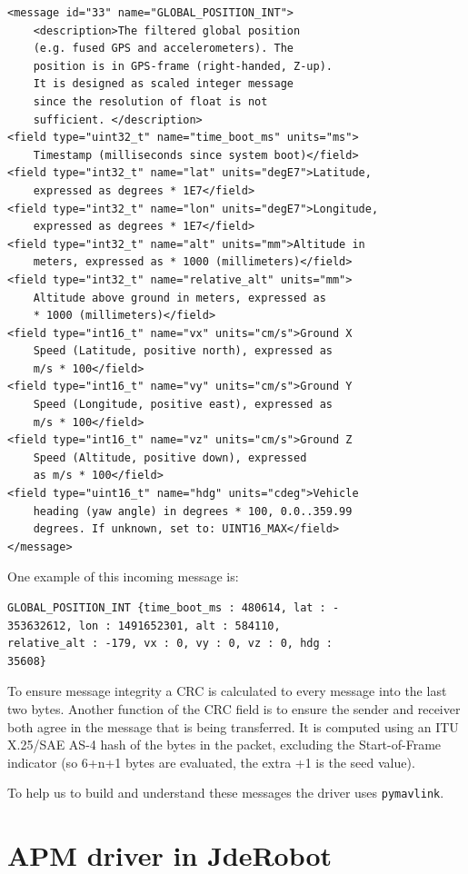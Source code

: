 \documentclass{llncs}
\begin{document}
\begin{verbatim}
<message id="33" name="GLOBAL_POSITION_INT">
	<description>The filtered global position 
	(e.g. fused GPS and accelerometers). The 
	position is in GPS-frame (right-handed, Z-up).
	It is designed as scaled integer message 
	since the resolution of float is not 
	sufficient.	</description>
<field type="uint32_t" name="time_boot_ms" units="ms">
	Timestamp (milliseconds since system boot)</field>
<field type="int32_t" name="lat" units="degE7">Latitude, 
	expressed as degrees * 1E7</field>
<field type="int32_t" name="lon" units="degE7">Longitude, 
	expressed as degrees * 1E7</field>
<field type="int32_t" name="alt" units="mm">Altitude in 
	meters, expressed as * 1000 (millimeters)</field>
<field type="int32_t" name="relative_alt" units="mm">
	Altitude above ground in meters, expressed as 
	* 1000 (millimeters)</field>
<field type="int16_t" name="vx" units="cm/s">Ground X 
	Speed (Latitude, positive north), expressed as 
	m/s * 100</field>
<field type="int16_t" name="vy" units="cm/s">Ground Y 
	Speed (Longitude, positive east), expressed as 
	m/s * 100</field>
<field type="int16_t" name="vz" units="cm/s">Ground Z 
	Speed (Altitude, positive down), expressed 
	as m/s * 100</field>
<field type="uint16_t" name="hdg" units="cdeg">Vehicle 
	heading (yaw angle) in degrees * 100, 0.0..359.99 
	degrees. If unknown, set to: UINT16_MAX</field>
</message>
\end{verbatim}

One example of this incoming message is:
\begin{verbatim}
GLOBAL_POSITION_INT {time_boot_ms : 480614, lat : -
353632612, lon : 1491652301, alt : 584110, 
relative_alt : -179, vx : 0, vy : 0, vz : 0, hdg : 
35608}
\end{verbatim}

To ensure message integrity a CRC is calculated to every message into the last two bytes. Another function of the CRC field is to ensure the sender and receiver both agree in the message that is being transferred. It is computed using an ITU X.25/SAE AS-4 hash of the bytes in the packet, excluding the Start-of-Frame indicator (so 6+n+1 bytes are evaluated, the extra +1 is the seed value).

To help us to build and understand these messages the driver uses \texttt{pymavlink}.


\section{APM driver in JdeRobot}
\end{document}

